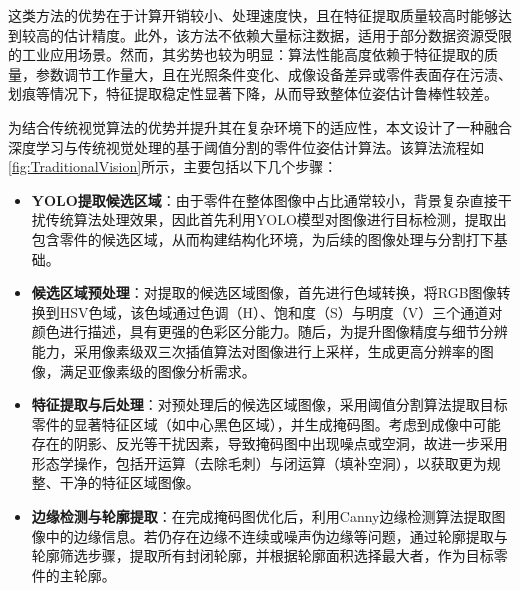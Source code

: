 \documentclass{Diploma}
\begin{document}
这类方法的优势在于计算开销较小、处理速度快，且在特征提取质量较高时能够达到较高的估计精度。此外，该方法不依赖大量标注数据，适用于部分数据资源受限的工业应用场景。然而，其劣势也较为明显：算法性能高度依赖于特征提取的质量，参数调节工作量大，且在光照条件变化、成像设备差异或零件表面存在污渍、划痕等情况下，特征提取稳定性显著下降，从而导致整体位姿估计鲁棒性较差。

为结合传统视觉算法的优势并提升其在复杂环境下的适应性，本文设计了一种融合深度学习与传统视觉处理的基于阈值分割的零件位姿估计算法。该算法流程如\ref{fig:TraditionalVision}所示，主要包括以下几个步骤：

%

\begin{itemize}
  \item \textbf{YOLO提取候选区域}：由于零件在整体图像中占比通常较小，背景复杂直接干扰传统算法处理效果，因此首先利用YOLO模型对图像进行目标检测，提取出包含零件的候选区域，从而构建结构化环境，为后续的图像处理与分割打下基础。
  
  \item \textbf{候选区域预处理}：对提取的候选区域图像，首先进行色域转换，将RGB图像转换到HSV色域，该色域通过色调（H）、饱和度（S）与明度（V）三个通道对颜色进行描述，具有更强的色彩区分能力。随后，为提升图像精度与细节分辨能力，采用像素级双三次插值算法对图像进行上采样，生成更高分辨率的图像，满足亚像素级的图像分析需求。
  
  \item \textbf{特征提取与后处理}：对预处理后的候选区域图像，采用阈值分割算法提取目标零件的显著特征区域（如中心黑色区域），并生成掩码图。考虑到成像中可能存在的阴影、反光等干扰因素，导致掩码图中出现噪点或空洞，故进一步采用形态学操作，包括开运算（去除毛刺）与闭运算（填补空洞），以获取更为规整、干净的特征区域图像。
  
  \item \textbf{边缘检测与轮廓提取}：在完成掩码图优化后，利用Canny边缘检测算法\cite{canny1986computational}提取图像中的边缘信息。若仍存在边缘不连续或噪声伪边缘等问题，通过轮廓提取与轮廓筛选步骤，提取所有封闭轮廓，并根据轮廓面积选择最大者，作为目标零件的主轮廓。


\end{itemize}
\end{document}
